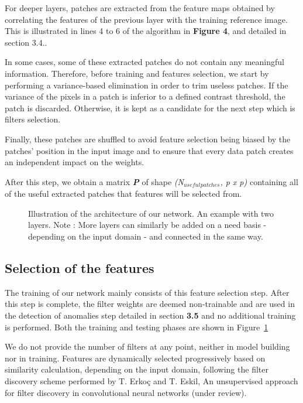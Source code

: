 \documentclass[3p,,preprint,review,12pt]{elsarticle}
\makeatletter
\def\fixFloatSize#1{}%
\makeatother
\begin{document}
For deeper layers, patches are extracted from the feature maps obtained by correlating the features of the previous layer with the training reference image. This is illustrated in lines 4 to 6 of the algorithm in \textbf{Figure 4}, and detailed in section {3.4.}.

In some cases, some of these extracted patches do not contain any meaningful information. Therefore, before training and features selection, we start by performing a variance-based elimination in order to trim useless patches. If the variance of the pixels in a patch is inferior to a defined contrast threshold, the patch is discarded. Otherwise, it is kept as a candidate for the next step which is filters selection. 

Finally, these patches are shuffled to avoid feature selection being biased by the patches' position in the input image and to ensure that every data patch creates an independent impact on the weights. 

After this step, we obtain a matrix \textbf{\textit{P}} of shape \textit{(N\ensuremath{_{useful}}\ensuremath{_{patches}}, p x p)} containing all of the useful extracted patches that features will be selected from.

\bgroup
\fixFloatSize{Figures/Figure4.PNG}
\begin{figure}[!htbp]
\centering \makeatletter{}
\makeatother 
\caption{{Illustration of the architecture of our network. An example with two layers.
Note : More layers can similarly be added on a need basis - depending on the input domain - and connected in the same way.}}
\label{f-TypicalNetworkArch}
\end{figure}
\egroup

\subsection{Selection of the features}
The training of our network mainly consists of this feature selection step. After this step is complete, the filter weights are deemed non-trainable and are used in the detection of anomalies step detailed in section \textbf{3.5} and no additional training is performed. Both the training and testing phases are shown in Figure~\ref{f-TypicalNetworkArch}

We do not provide the number of filters at any point, neither in model building nor in training. Features are dynamically selected progressively based on similarity calculation, depending on the input domain, following the filter discovery scheme performed by T. Erkoç and T. Eskil, An unsupervised approach for filter discovery in convolutional neural networks (under review).
\end{document}
